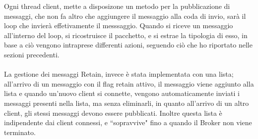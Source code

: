 \documentclass{article}
\begin{document}
Ogni thread client, mette a disposizone un metodo per la pubblicazione di messaggi, che non fa altro che aggiungere il messaggio alla coda di invio, sarà il loop che invierà effetivamente il messsaggio. Quando si riceve un messaggio all'interno del loop, si ricostruisce il pacchetto, e si estrae la tipologia di esso, in base a ciò vengono intraprese differenti azioni, seguendo ciò che ho riportato nelle sezioni precedenti.\\\\
La gestione dei messaggi Retain, invece è stata implementata con una lista; all'arrivo di un messaggio con il flag retain attivo, il messaggio viene aggiunto alla lista e quando un'nuovo client si connette, vengono automaticamente inviati i messaggi presenti nella lista, ma senza eliminarli, in quanto all'arrivo di un altro client, gli stessi messaggi devono essere pubblicati. Inoltre questa lista è indipendente dai client connessi, e ``sopravvive" fino a quando il Broker non viene terminato.
\end{document}
